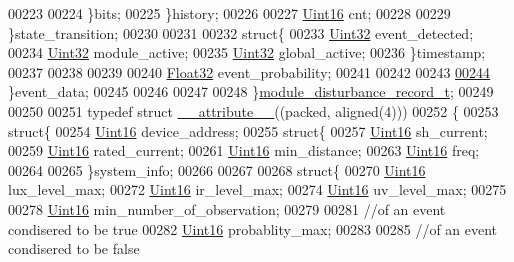 \begin{DoxyCode}
00223 
00224         \}bits;
00225     \}history;
00226 
00227     \hyperlink{a00001_aae7407b021d43f7193a81a58cfb3e297}{Uint16} cnt;
00228 
00229     \}state\_transition;
00230 
00231 
00232     \textcolor{keyword}{struct}\{
00233      \hyperlink{a00001_ab56a7153a5b218eac7698ff141009735}{Uint32}                    event\_detected;
00234      \hyperlink{a00001_ab56a7153a5b218eac7698ff141009735}{Uint32}                    module\_active;
00235      \hyperlink{a00001_ab56a7153a5b218eac7698ff141009735}{Uint32}                    global\_active;
00236     \}timestamp;
00237 
00238 
00239 
00240     \hyperlink{a00001_a87d38f886e617ced2698fc55afa07637}{Float32}                    event\_probability;
00241 
00242 
00243 
\hypertarget{a00003_source_l00244}{}\hyperlink{a00008_a5a700ec4c240f4e86c5fb61aef8d983e}{00244}     \}event\_data;
00245 
00246 
00247 
00248 \}\hyperlink{a00008}{module\_disturbance\_record\_t};
00249 
00250 
00251 \textcolor{keyword}{typedef} \textcolor{keyword}{struct }\hyperlink{a00003_ad8187eb7fe09751a387e3dcb11c51565}{\_\_attribute\_\_}((packed, aligned(4)))
00252 \{
00253     \textcolor{keyword}{struct}\{
00254         \hyperlink{a00001_aae7407b021d43f7193a81a58cfb3e297}{Uint16}                              device\_address;
00255         \textcolor{keyword}{struct}\{
00257         \hyperlink{a00001_aae7407b021d43f7193a81a58cfb3e297}{Uint16}                              sh\_current;
00259         \hyperlink{a00001_aae7407b021d43f7193a81a58cfb3e297}{Uint16}                              rated\_current;
00261         \hyperlink{a00001_aae7407b021d43f7193a81a58cfb3e297}{Uint16}                              min\_distance;
00263         \hyperlink{a00001_aae7407b021d43f7193a81a58cfb3e297}{Uint16}                              freq;
00264 
00265         \}system\_info;
00266 
00267 
00268         \textcolor{keyword}{struct}\{
00270         \hyperlink{a00001_aae7407b021d43f7193a81a58cfb3e297}{Uint16}                              lux\_level\_max;
00272         \hyperlink{a00001_aae7407b021d43f7193a81a58cfb3e297}{Uint16}                              ir\_level\_max;
00274         \hyperlink{a00001_aae7407b021d43f7193a81a58cfb3e297}{Uint16}                              uv\_level\_max;
00275 
00278         \hyperlink{a00001_aae7407b021d43f7193a81a58cfb3e297}{Uint16}                              min\_number\_of\_observation;
00279 
00281         \textcolor{comment}{//of an event condisered to be true}
00282         \hyperlink{a00001_aae7407b021d43f7193a81a58cfb3e297}{Uint16}                              probablity\_max;
00283 
00285         \textcolor{comment}{//of an event condisered to be false}

\end{DoxyCode}
